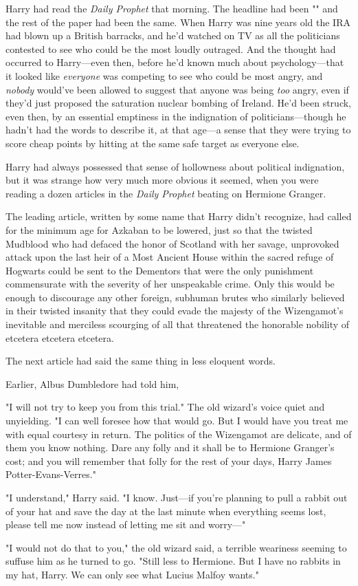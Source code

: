 Harry had read the \emph{Daily Prophet} that morning. The headline had been
"" and the rest of the paper had been
the same. When Harry was nine years old the IRA had blown up a British
barracks, and he'd watched on TV as all the politicians contested to see who
could be the most loudly outraged. And the thought had occurred to Harry---even
then, before he'd known much about psychology---that it looked like
\emph{everyone} was competing to see who could be most angry, and \emph{nobody}
would've been allowed to suggest that anyone was being \emph{too} angry, even
if they'd just proposed the saturation nuclear bombing of Ireland. He'd been
struck, even then, by an essential emptiness in the indignation of
politicians---though he hadn't had the words to describe it, at that age---a
sense that they were trying to score cheap points by hitting at the same safe
target as everyone else.

Harry had always possessed that sense of hollowness about political
indignation, but it was strange how very much more obvious it seemed, when you
were reading a dozen articles in the \emph{Daily Prophet} beating on Hermione
Granger.

The leading article, written by some name that Harry didn't recognize, had
called for the minimum age for Azkaban to be lowered, just so that the twisted
Mudblood who had defaced the honor of Scotland with her savage, unprovoked
attack upon the last heir of a Most Ancient House within the sacred refuge of
Hogwarts could be sent to the Dementors that were the only punishment
commensurate with the severity of her unspeakable crime. Only this would be
enough to discourage any other foreign, subhuman brutes who similarly believed
in their twisted insanity that they could evade the majesty of the Wizengamot's
inevitable and merciless scourging of all that threatened the honorable
nobility of etcetera etcetera etcetera.

The next article had said the same thing in less eloquent words.

Earlier, Albus Dumbledore had told him,

\begin{em}
"I will not try to keep you from this trial." The old wizard's voice
quiet and unyielding. "I can well foresee how that would go. But I would have
you treat me with equal courtesy in return. The politics of the Wizengamot are
delicate, and of them you know nothing. Dare any folly and it shall be to
Hermione Granger's cost; and you will remember that folly for the rest of your
days, Harry James Potter-Evans-Verres."

"I understand," Harry said. "I know. Just---if you're planning to pull a
rabbit out of your hat and save the day at the last minute when everything
seems lost, please tell me now instead of letting me sit and worry\mbox{---}"

"I would not do that to you," the old wizard said, a terrible weariness
seeming to suffuse him as he turned to go. "Still less to Hermione. But I have
no rabbits in my hat, Harry. We can only see what Lucius Malfoy wants."
\end{em}

